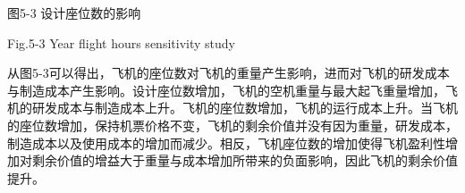 \documentclass[12pt]{article}
\begin{document}
\begin{CJK*}{UTF8}{gbsn}

\par

\begin{Center}
图5-3 设计座位数的影响
\end{Center}\par

\begin{Center}
Fig.5-3 Year flight hours sensitivity study 
\end{Center}\par


\vspace{\baselineskip}
从图5-3可以得出，飞机的座位数对飞机的重量产生影响，进而对飞机的研发成本与制造成本产生影响。设计座位数增加，飞机的空机重量与最大起飞重量增加，飞机的研发成本与制造成本上升。飞机的座位数增加，飞机的运行成本上升。当飞机的座位数增加，保持机票价格不变，飞机的剩余价值并没有因为重量，研发成本，制造成本以及使用成本的增加而减少。相反，飞机座位数的增加使得飞机盈利性增加对剩余价值的增益大于重量与成本增加所带来的负面影响，因此飞机的剩余价值提升。\par

\end{CJK*}

\printbibliography
\end{document}
